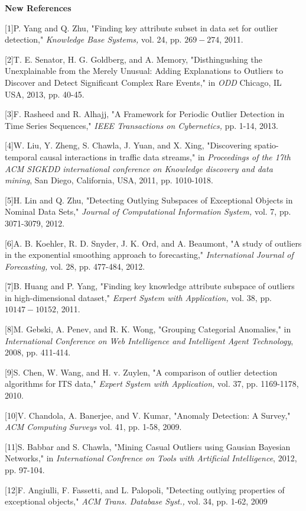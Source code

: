 \documentclass{book}
\begin{document}
\textbf{New References }

[1]P. Yang and Q. Zhu, "Finding key attribute subset in data set for outlier detection," \textit{Knowledge Base Systems, }vol. 24, pp. $269 - 274$, 2011.

[2]T. E. Senator, H. G. Goldberg, and A. Memory, "Disthingushing the Unexplainable from the Merely Unusual: Adding Explanations to Outliers to Discover and Detect Significant Complex Rare Events," in \textit{ODD }Chicago, IL USA, 2013, pp. 40-45.

[3]F. Rasheed and R. Alhajj, "A Framework for Periodic Outlier Detection in Time Series Sequences," \textit{IEEE Transactions on Cybernetics, }pp. 1-14, 2013.

[4]W. Liu, Y. Zheng, S. Chawla, J. Yuan, and X. Xing, "Discovering spatio-temporal causal interactions in traffic data streams," in \textit{Proceedings of the 17th ACM SIGKDD international conference on Knowledge discovery and data mining}, San Diego, California, USA, 2011, pp. 1010-1018.

[5]H. Lin and Q. Zhu, "Detecting Outlying Subspaces of Exceptional Objects in Nominal Data Sets," \textit{Journal of Computational Information System, }vol. 7, pp. 3071-3079, 2012.

[6]A. B. Koehler, R. D. Snyder, J. K. Ord, and A. Beaumont, "A study of outliers in the exponential smoothing approach to forecasting," \textit{International Journal of Forecasting, }vol. 28, pp. 477-484, 2012.

[7]B. Huang and P. Yang, "Finding key knowledge attribute subspace of outliers in high-dimensional dataset," \textit{Expert System with Application, }vol. 38, pp. $10147 - 10152$, 2011.

[8]M. Gebski, A. Penev, and R. K. Wong, "Grouping Categorial Anomalies," in \textit{International Conference on Web Intelligence and Intelligent Agent Technology}, 2008, pp. 411-414.

[9]S. Chen, W. Wang, and H. v. Zuylen, "A comparison of outlier detection algorithms for ITS data," \textit{Expert System with Application, }vol. 37, pp. 1169-1178, 2010.

[10]V. Chandola, A. Banerjee, and V. Kumar, "Anomaly Detection: A Survey," \textit{ACM Computing Surveys }vol. 41, pp. 1-58, 2009.

[11]S. Babbar and S. Chawla, "Mining Casual Outliers using Gausian Bayesian Networks," in \textit{International Confrence on Tools with Artificial Intelligence}, 2012, pp. 97-104.

[12]F. Angiulli, F. Fassetti, and L. Palopoli, "Detecting outlying properties of exceptional objects," \textit{ACM Trans. Database Syst., }vol. 34, pp. 1-62, 2009
\end{document}
